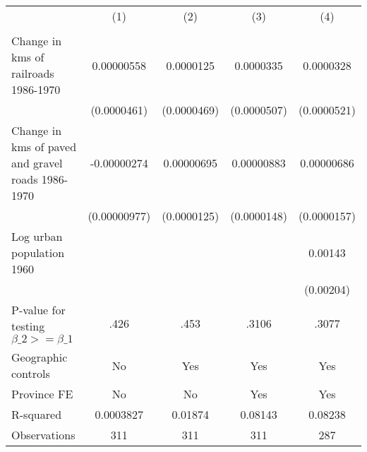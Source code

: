 {
\def\sym#1{\ifmmode^{#1}\else\(^{#1}\)\fi}
\begin{tabular}{l*{4}{c}}
\hline\hline
                &\multicolumn{1}{c}{(1)}&\multicolumn{1}{c}{(2)}&\multicolumn{1}{c}{(3)}&\multicolumn{1}{c}{(4)}\\
                &\multicolumn{1}{c}{}&\multicolumn{1}{c}{}&\multicolumn{1}{c}{}&\multicolumn{1}{c}{}\\
\hline
Change in kms of railroads 1986-1970&0.00000558         &0.0000125         &0.0000335         &0.0000328         \\
                &(0.0000461)         &(0.0000469)         &(0.0000507)         &(0.0000521)         \\
[1em]
Change in kms of paved and gravel roads 1986-1970&-0.00000274         &0.00000695         &0.00000883         &0.00000686         \\
                &(0.00000977)         &(0.0000125)         &(0.0000148)         &(0.0000157)         \\
[1em]
Log urban population 1960&                  &                  &                  &  0.00143         \\
                &                  &                  &                  &(0.00204)         \\
\hline
P-value for testing $\beta\_{2} >= \beta\_{1}$&     .426         &     .453         &    .3106         &    .3077         \\
Geographic controls&       No         &      Yes         &      Yes         &      Yes         \\
Province FE     &       No         &       No         &      Yes         &      Yes         \\
R-squared       &0.0003827         &  0.01874         &  0.08143         &  0.08238         \\
Observations    &      311         &      311         &      311         &      287         \\
\hline\hline
\end{tabular}
}
